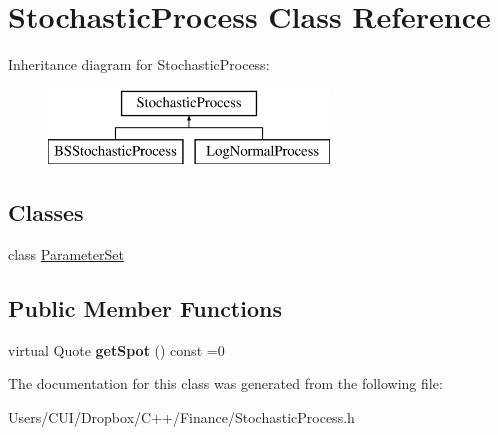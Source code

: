 \hypertarget{class_stochastic_process}{}\section{Stochastic\+Process Class Reference}
\label{class_stochastic_process}
Inheritance diagram for Stochastic\+Process\+:\begin{figure}[H]
\begin{center}
\leavevmode
\includegraphics[height=2.000000cm]{class_stochastic_process}
\end{center}
\end{figure}
\subsection*{Classes}
\begin{DoxyCompactItemize}
\item 
class \hyperlink{class_stochastic_process_1_1_parameter_set}{Parameter\+Set}
\end{DoxyCompactItemize}
\subsection*{Public Member Functions}
\begin{DoxyCompactItemize}
\item 
\hypertarget{class_stochastic_process_aad2ef51ca4bc2fe5f33a73e8f0ee361e}{}\label{class_stochastic_process_aad2ef51ca4bc2fe5f33a73e8f0ee361e} 
virtual Quote {\bfseries get\+Spot} () const =0
\end{DoxyCompactItemize}


The documentation for this class was generated from the following file\+:\begin{DoxyCompactItemize}
\item 
Users/\+C\+U\+I/\+Dropbox/\+C++/\+Finance/Stochastic\+Process.\+h\end{DoxyCompactItemize}
